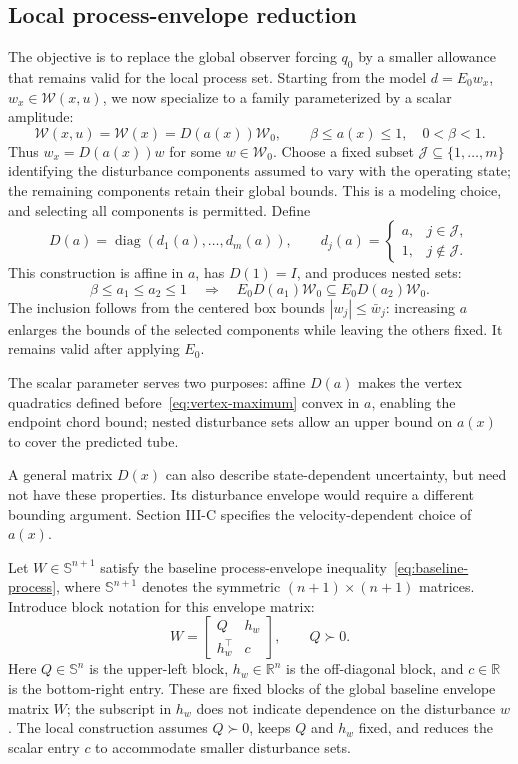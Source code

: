 \documentclass[11pt,a4paper]{article}
\numberwithin{equation}{section}
\theoremstyle{remark}\newtheorem{remark}{Remark}
\newcommand{\R}{\mathbb R}
\newcommand{\diag}{\operatorname{diag}}
\newcommand{\cW}{\mathcal W}
\begin{document}
\subsection{Local process-envelope reduction}\label{sec:local-envelope}
The objective is to replace the global observer forcing $q_0$ by a smaller allowance that remains valid for the local process set. Starting from the model $d=E_0w_x$, $w_x\in\mathcal W(x,u)$, we now specialize to a family parameterized by a scalar amplitude:
\begin{equation}\label{eq:scheduled-set}
\mathcal W(x,u)=\mathcal W(x)=D(a(x))\cW_0,
\qquad \beta\le a(x)\le1,\quad 0<\beta<1.
\end{equation}
Thus $w_x=D(a(x))w$ for some $w\in\cW_0$. Choose a fixed subset $\mathcal J\subseteq\{1,\ldots,m\}$ identifying the disturbance components assumed to vary with the operating state; the remaining components retain their global bounds. This is a modeling choice, and selecting all components is permitted. Define
\[
D(a)=\diag(d_1(a),\ldots,d_m(a)),\qquad
 d_j(a)=\begin{cases}a,&j\in\mathcal J,\\1,&j\notin\mathcal J.\end{cases}
\]
This construction is affine in $a$, has $D(1)=I$, and produces nested sets:
\begin{equation}\label{eq:set-nesting}
\beta\le a_1\le a_2\le1
\quad\Longrightarrow\quad
E_0D(a_1)\cW_0\subseteq E_0D(a_2)\cW_0.
\end{equation}
The inclusion follows from the centered box bounds $|w_j|\le\bar w_j$: increasing $a$ enlarges the bounds of the selected components while leaving the others fixed. It remains valid after applying $E_0$.

The scalar parameter serves two purposes: affine $D(a)$ makes the vertex quadratics defined before~\eqref{eq:vertex-maximum} convex in $a$, enabling the endpoint chord bound; nested disturbance sets allow an upper bound on $a(x)$ to cover the predicted tube.

A general matrix $D(x)$ can also describe state-dependent uncertainty, but need not have these properties. Its disturbance envelope would require a different bounding argument. Section III-C specifies the velocity-dependent choice of $a(x)$.

Let $W\in\mathbb S^{n+1}$ satisfy the baseline process-envelope inequality~\eqref{eq:baseline-process}, where $\mathbb S^{n+1}$ denotes the symmetric $(n+1)\times(n+1)$ matrices. Introduce block notation for this envelope matrix:
\begin{equation}
W=\begin{bmatrix}Q&h_w\\h_w^\top&c\end{bmatrix},\qquad Q\succ0.
\end{equation}
Here $Q\in\mathbb S^n$ is the upper-left block, $h_w\in\R^n$ is the off-diagonal block, and $c\in\R$ is the bottom-right entry. These are fixed blocks of the global baseline envelope matrix $W$; the subscript in $h_w$ does not indicate dependence on the disturbance $w$. The local construction assumes $Q\succ0$, keeps $Q$ and $h_w$ fixed, and reduces the scalar entry $c$ to accommodate smaller disturbance sets.
\end{document}
